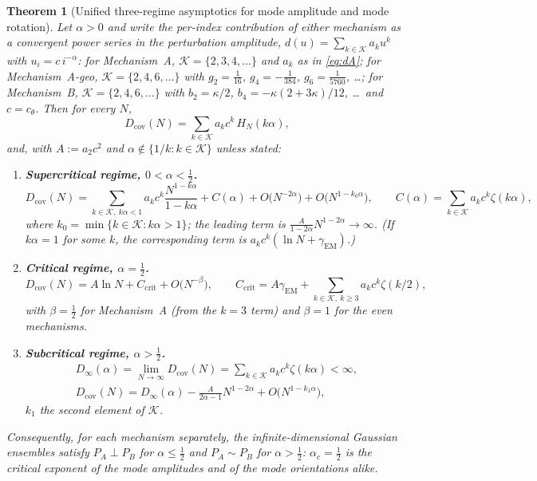 \documentclass[11pt,reqno]{amsart}
\theoremstyle{plain}
\newtheorem{theorem}{Theorem}[section]
\theoremstyle{definition}
\theoremstyle{remark}
\numberwithin{equation}{section}
\newcommand{\Dcov}{D_{\mathrm{cov}}}
\newcommand{\PA}{P_{A}}
\newcommand{\PB}{P_{B}}
\newcommand{\gEM}{\gamma_{\mathrm{EM}}}
\begin{document}
\begin{theorem}[Unified three-regime asymptotics for mode amplitude and mode rotation]\label{thm:threeregime}
Let $\alpha>0$ and write the per-index contribution of either mechanism as a convergent power series in the perturbation amplitude, $d(u)=\sum_{k\in\mathcal K}a_ku^k$ with $u_i=c\,i^{-\alpha}$: for Mechanism~A, $\mathcal K=\{2,3,4,\dots\}$ and $a_k$ as in \eqref{eq:dA}; for Mechanism~A-geo, $\mathcal K=\{2,4,6,\dots\}$ with $g_2=\tfrac1{16}$, $g_4=-\tfrac1{384}$, $g_6=\tfrac1{5760}$, \dots; for Mechanism~B, $\mathcal K=\{2,4,6,\dots\}$ with $b_2=\kappa/2$, $b_4=-\kappa(2+3\kappa)/12$, \dots\ and $c=c_\theta$. Then for every $N$,
\begin{equation}\label{eq:Dseries}
\Dcov(N)=\sum_{k\in\mathcal K}a_kc^k\,H_N(k\alpha),
\end{equation}
and, with $A:=a_2c^2$ and $\alpha\notin\{1/k:k\in\mathcal K\}$ unless stated:
\begin{enumerate}[label=\textup{(\arabic*)}]
\item \textbf{Supercritical regime, $0<\alpha<\tfrac12$.}
\begin{equation}\label{eq:super}
\Dcov(N)=\sum_{k\in\mathcal K,\ k\alpha<1}a_kc^k\frac{N^{1-k\alpha}}{1-k\alpha}+C(\alpha)+O\bigl(N^{-2\alpha}\bigr)+O\bigl(N^{1-k_0\alpha}\bigr),\qquad C(\alpha)=\sum_{k\in\mathcal K}a_kc^k\zeta(k\alpha),
\end{equation}
where $k_0=\min\{k\in\mathcal K:k\alpha>1\}$; the leading term is $\frac{A}{1-2\alpha}N^{1-2\alpha}\to\infty$. (If $k\alpha=1$ for some $k$, the corresponding term is $a_kc^k(\ln N+\gEM)$.)
\item \textbf{Critical regime, $\alpha=\tfrac12$.}
\begin{equation}\label{eq:crit}
\Dcov(N)=A\ln N+C_{\mathrm{crit}}+O\bigl(N^{-\beta}\bigr),\qquad C_{\mathrm{crit}}=A\gEM+\sum_{k\in\mathcal K,\ k\ge3}a_kc^k\zeta(k/2),
\end{equation}
with $\beta=\tfrac12$ for Mechanism~A (from the $k=3$ term) and $\beta=1$ for the even mechanisms.
\item \textbf{Subcritical regime, $\alpha>\tfrac12$.}
\begin{equation}\label{eq:sub}
\begin{gathered}
D_\infty(\alpha)=\lim_{N\to\infty}\Dcov(N)=\sum_{k\in\mathcal K}a_kc^k\zeta(k\alpha)<\infty,\\
\Dcov(N)=D_\infty(\alpha)-\frac{A}{2\alpha-1}N^{1-2\alpha}+O\bigl(N^{1-k_1\alpha}\bigr),
\end{gathered}
\end{equation}
$k_1$ the second element of $\mathcal K$.
\end{enumerate}
Consequently, for each mechanism separately, the infinite-dimensional Gaussian ensembles satisfy $\PA\perp\PB$ for $\alpha\le\tfrac12$ and $\PA\sim\PB$ for $\alpha>\tfrac12$: $\alpha_c=\tfrac12$ is the critical exponent of the mode amplitudes and of the mode orientations alike.
\end{theorem}
\end{document}
